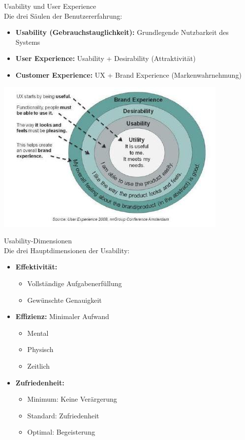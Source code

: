 \begin{concept}{Usability und User Experience}\\
Die drei Säulen der Benutzererfahrung:
\begin{itemize}
    \item \textbf{Usability (Gebrauchstauglichkeit):} Grundlegende Nutzbarkeit des Systems
    \item \textbf{User Experience:} Usability + Desirability (Attraktivität)
    \item \textbf{Customer Experience:} UX + Brand Experience (Markenwahrnehmung)
\end{itemize}
\includegraphics[width=0.9\linewidth]{images/2024_12_29_0d1d7b5551ea1b4b41bdg-02}
\end{concept}

\begin{definition}{Usability-Dimensionen}\\
Die drei Hauptdimensionen der Usability:
\begin{itemize}
    \item \textbf{Effektivität:}
    \begin{itemize}
        \item Vollständige Aufgabenerfüllung
        \item Gewünschte Genauigkeit
    \end{itemize}
    \item \textbf{Effizienz:} Minimaler Aufwand
    \begin{itemize}
        \item Mental
        \item Physisch
        \item Zeitlich
    \end{itemize}
    \item \textbf{Zufriedenheit:}
    \begin{itemize}
        \item Minimum: Keine Verärgerung
        \item Standard: Zufriedenheit
        \item Optimal: Begeisterung
    \end{itemize}
\end{itemize}
\end{definition}

